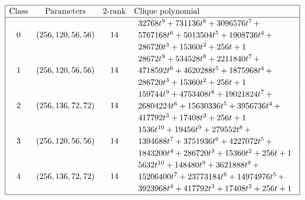 \documentclass[12pt,a4paper]{article}
\begin{document}
\begin{table}[!bhpt] %
%
\small{}
\begin{align*}
\def\arraystretch{1.2}
\begin{array}{|cccl|}
\hline
\text{Class} &
\text{Parameters} &
\text{2-rank} &
\text{Clique polynomial}
\\
\hline
0 &
(256, 120, 56, 56) &
14 &
\begin{array}{l}
32768t^{9} + 731136t^{8} + 3096576t^{7}
\,+
\\
 5767168t^{6} + 5013504t^{5} + 1908736t^{4}
\,+
\\
 286720t^{3} + 15360t^{2} + 256t + 1
\end{array}
\\
1 &
(256, 120, 56, 56) &
14 &
\begin{array}{l}
28672t^{9} + 534528t^{8} + 2211840t^{7}
\,+
\\
 4718592t^{6} + 4620288t^{5} + 1875968t^{4}
\,+
\\
 286720t^{3} + 15360t^{2} + 256t + 1
\end{array}
\\
2 &
(256, 136, 72, 72) &
14 &
\begin{array}{l}
159744t^{9} + 4753408t^{8} + 19021824t^{7}
\,+
\\
 26804224t^{6} + 15630336t^{5} + 3956736t^{4}
\,+
\\
 417792t^{3} + 17408t^{2} + 256t + 1
\end{array}
\\
3 &
(256, 120, 56, 56) &
14 &
\begin{array}{l}
1536t^{10} + 19456t^{9} + 279552t^{8}
\,+
\\
 1394688t^{7} + 3751936t^{6} + 4227072t^{5}
\,+
\\
 1843200t^{4} + 286720t^{3} + 15360t^{2} + 256t + 1
\end{array}
\\
4 &
(256, 136, 72, 72) &
14 &
\begin{array}{l}
5632t^{10} + 148480t^{9} + 3621888t^{8}
\,+
\\
 15206400t^{7} + 23773184t^{6} + 14974976t^{5}
\,+
\\
 3923968t^{4} + 417792t^{3} + 17408t^{2} + 256t + 1
\end{array}
\\
\hline
\end{array}
\end{align*}
\caption{$[f_{8,6}]$ extended Cayley classes (part 1).}
\label{tab-c8_6_EC_classes}
\end{table}
\end{document}
